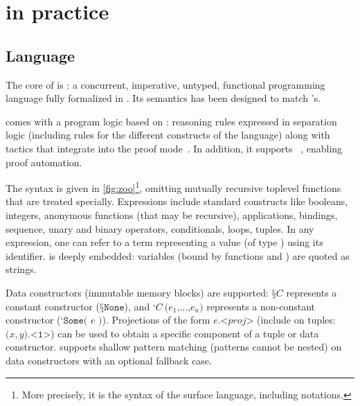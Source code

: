 \section{\Zoo in practice}
\label{sec:zoo}


\subsection{Language}

The core of \Zoo is \ZooLang: a concurrent, imperative, untyped, functional programming language fully formalized in \Rocq.
Its semantics has been designed to match \OCaml's.

\ZooLang comes with a program logic based on \Iris: reasoning rules expressed in separation logic (including rules for the different constructs of the language) along with \Rocq tactics that integrate into the \Iris proof mode~\cite{%
  DBLP:journals/pacmpl/KrebbersJ0TKTCD18}.
In addition, it supports \Diaframe~\cite{DBLP:conf/pldi/MulderKG22%
}, enabling proof automation.



The \ZooLang syntax is given in \cref{fig:zoo}\footnote{More precisely, it is the syntax of the surface language, including \Rocq notations.}, omitting mutually recursive toplevel functions that are treated specially.
Expressions include standard constructs like booleans, integers, anonymous functions (that may be recursive), applications,  bindings, sequence, unary and binary operators, conditionals,  loops, tuples.
In any expression, one can refer to a \Rocq term representing a \ZooLang value (of type ) using its \Rocq identifier.
\ZooLang is deeply embedded: variables (bound by functions and ) are quoted as strings.

Data constructors (immutable memory blocks) are supported: $\texttt{§}C$ represents a constant constructor (\eg $\texttt{§}\texttt{None}$), and $\texttt{‘} C\ \texttt{(} e_1 \texttt{,} \dots \texttt{,} e_n \texttt{)}$ represents a non-constant constructor (\eg $\texttt{‘} \texttt{Some( } e \texttt{ )}$).
Projections of the form $e \texttt{.<} \mathit{proj} \texttt{>}$ (include on tuples: $\texttt{(} x, y \texttt{).<1>}$) can be used to obtain a specific component of a tuple or data constructor.
\ZooLang supports shallow pattern matching (patterns cannot be nested) on data constructors with an optional fallback case.

